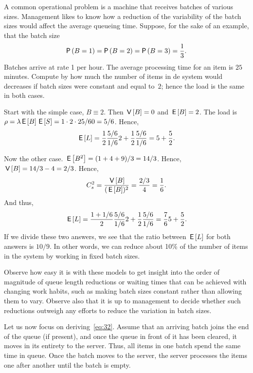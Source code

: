 \begin{exercise}\label{ex:64}
  A common operational problem is a machine that receives batches of
  various sizes. Management likes to know how a reduction of the
  variability of the batch sizes would affect the average queueing time.
  Suppose, for the sake of an example, that the batch size 
  \begin{equation*}
    \P{B=1} = \P{B=2} = \P{B=3} = \frac 13.
  \end{equation*}
  Batches arrive at rate 1 per hour.
  The average processing time for an item is $25$ minutes.
  Compute by how much the number of items in de system would decreases if batch sizes were constant and equal to~$2$; hence the load is the same in both cases.
  \begin{solution}
    Start with the simple case, $B\equiv 2$. Then $\,\mathsf{V}\left[B\right]=0$ and
    $\,\mathsf{E}\left[B\right] = 2$. The load is $\rho=\lambda \,\mathsf{E}\left[B\right] \,\mathsf{E}\left[S\right] = 1\cdot 2 \cdot 25/60 = 5/6$.  Hence,
    \begin{equation*}
      \,\mathsf{E}\left[L\right] = \frac 12 \frac{5/6}{1/6} 2 + \frac 12 \frac{5/6}{1/6} = 5 + \frac52.
    \end{equation*}

Now the other case. $\,\mathsf{E}\left[B^2\right] = (1+4+9)/3 = 14/3$. Hence, $\,\mathsf{V}\left[B\right]=14/3 - 4=2/3$. Hence, 
\begin{equation*}
C_s^2=\frac{\,\mathsf{V}\left[B\right]}{(\,\mathsf{E}\left[B\right])^2} = \frac{2/3}4 = \frac 16.
\end{equation*}
And thus, 
    \begin{equation*}
      \,\mathsf{E}\left[L\right] = \frac {1+1/6}2 \frac{5/6}{1/6} 2 + \frac 12 \frac{5/6}{1/6} = \frac76 5 + \frac 52.
    \end{equation*}
    If we divide these two answers, we see that the ratio between
    $\,\mathsf{E}\left[L\right]$ for both answers is $10/9$. In other words, we can
    reduce about 10\% of the number of items in the system by working
    in fixed batch sizes. 

Observe how easy it is with these models to get insight into the order of magnitude of queue length reductions or waiting times that can be achieved with changing work habits, such as making batch sizes constant rather than allowing them to vary.
Observe also that it is up to management to decide whether such reductions outweigh any efforts to reduce the variation in batch sizes.

  \end{solution}

\end{exercise}


Let us now focus on deriving~\cref{eq:32}.
Assume that an arriving batch joins the end of the queue (if present), and once the queue in front of it has been cleared, it moves in its entirety to the server.
Thus, all items in one batch spend the same time in queue.
Once the batch moves to the server, the server processes the items one after another until the batch is empty.

